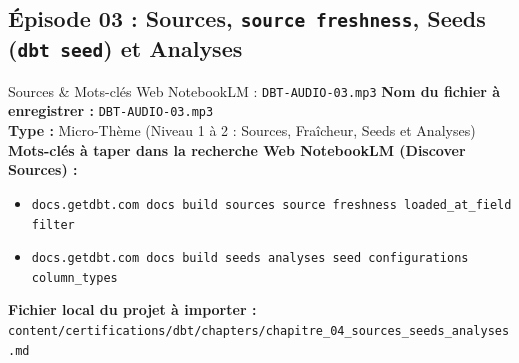 \documentclass[11pt,a4paper]{article}
\begin{document}
\subsection{Épisode 03 : Sources, \texttt{source freshness}, Seeds (\texttt{dbt seed}) et Analyses}
\begin{sourcebox}{Sources \& Mots-clés Web NotebookLM : \texttt{DBT-AUDIO-03.mp3}}
\textbf{Nom du fichier à enregistrer :} \texttt{DBT-AUDIO-03.mp3}\\
\textbf{Type :} Micro-Thème (Niveau 1 à 2 : Sources, Fraîcheur, Seeds et Analyses)\\
\textbf{Mots-clés à taper dans la recherche Web NotebookLM (Discover Sources) :}
\begin{itemize}[noitemsep]
    \item \texttt{docs.getdbt.com docs build sources source freshness loaded_at_field filter}
    \item \texttt{docs.getdbt.com docs build seeds analyses seed configurations column_types}
\end{itemize}
\textbf{Fichier local du projet à importer :}
\texttt{content/certifications/dbt/chapters/chapitre_04_sources_seeds_analyses.md}
\end{sourcebox}
\end{document}
